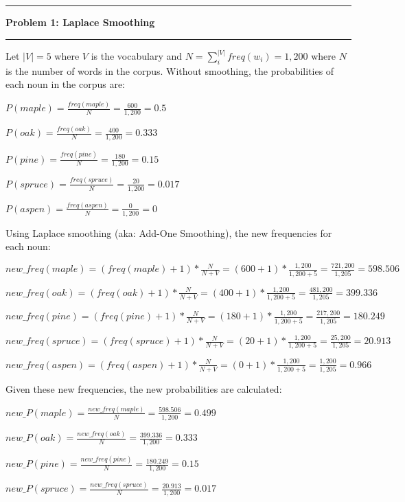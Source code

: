 \documentclass[11pt]{article}
\newcommand\question[2]{\vspace{.25in}\hrule\textbf{#1: #2}\vspace{.5em}\hrule\vspace{.10in}}
\begin{document}
\raggedright

\newcommand\NAME{Jake Pitkin}
\newcommand\UID{u0891770}
\newcommand\HWNUM{2}

\question{Problem 1}{Laplace Smoothing}

Let $|V| = 5$ where $V$ is the vocabulary and  $N = \sum\limits_{i}^{|V|} freq(w_i) = 1,200$ where $N$ is the number of words in the corpus. Without smoothing, the probabilities of each noun in the corpus are:

\qquad$P(maple) = \frac{freq(maple)}{N} = \frac{600}{1,200} = 0.5$

\qquad$P(oak) = \frac{freq(oak)}{N} = \frac{400}{1,200} = 0.333$

\qquad$P(pine) = \frac{freq(pine)}{N} = \frac{180}{1,200} = 0.15$

\qquad$P(spruce) = \frac{freq(spruce)}{N} = \frac{20}{1,200} = 0.017$

\qquad$P(aspen) = \frac{freq(aspen)}{N} = \frac{0}{1,200} = 0$

Using Laplace smoothing (aka: Add-One Smoothing), the new frequencies for each noun:

\qquad$new\_freq(maple) = (freq(maple) + 1) * \frac{N}{N + V} = (600 + 1) * \frac{1,200}{1,200 + 5} = \frac{721,200}{1,205} = 598.506$

\qquad$new\_freq(oak) = (freq(oak) + 1) * \frac{N}{N + V} = (400 + 1) * \frac{1,200}{1,200 + 5} = \frac{481,200}{1,205} = 399.336$

\qquad$new\_freq(pine) = (freq(pine) + 1) * \frac{N}{N + V} = (180 + 1) * \frac{1,200}{1,200 + 5} = \frac{217,200}{1,205} = 180.249$

\qquad$new\_freq(spruce) = (freq(spruce) + 1) * \frac{N}{N + V} = (20 + 1) * \frac{1,200}{1,200 + 5} = \frac{25,200}{1,205} = 20.913$

\qquad$new\_freq(aspen) = (freq(aspen) + 1) * \frac{N}{N + V} = (0 + 1) * \frac{1,200}{1,200 + 5} = \frac{1,200}{1,205} = 0.966$

Given these new frequencies, the new probabilities are calculated:

\qquad$new\_P(maple) = \frac{new\_freq(maple)}{N} = \frac{598.506}{1,200} = 0.499$

\qquad$new\_P(oak) = \frac{new\_freq(oak)}{N} = \frac{399.336}{1,200} = 0.333$

\qquad$new\_P(pine) = \frac{new\_freq(pine)}{N} = \frac{180.249}{1,200} = 0.15$

\qquad$new\_P(spruce) = \frac{new\_freq(spruce)}{N} = \frac{20.913}{1,200} = 0.017$
\end{document}
